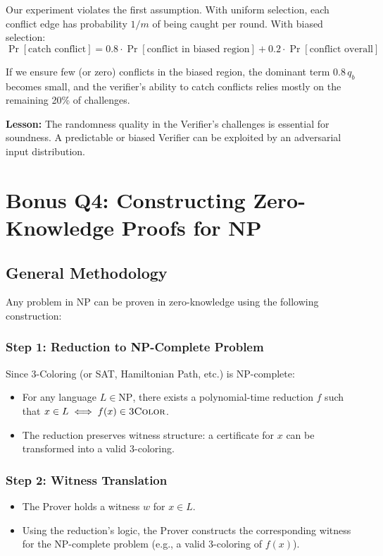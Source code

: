 \documentclass[11pt]{article}
\begin{document}
Our experiment violates the first assumption. With uniform selection, each conflict edge has probability $1/m$ of being caught per round. With biased selection:
\[
\Pr[\text{catch conflict}] = 0.8 \cdot \Pr[\text{conflict in biased region}] + 0.2 \cdot \Pr[\text{conflict overall}]
\]

If we ensure few (or zero) conflicts in the biased region, the dominant term $0.8\,q_b$ becomes small, and the verifier's ability to catch conflicts relies mostly on the remaining 20\% of challenges.

\textbf{Lesson:} The randomness quality in the Verifier's challenges is essential for soundness. A predictable or biased Verifier can be exploited by an adversarial input distribution.

\section{Bonus Q4: Constructing Zero-Knowledge Proofs for NP}

\subsection{General Methodology}

Any problem in NP can be proven in zero-knowledge using the following construction:

\subsubsection{Step 1: Reduction to NP-Complete Problem}
Since 3-Coloring (or SAT, Hamiltonian Path, etc.) is NP-complete:
\begin{itemize}
    \item For any language $L \in \text{NP}$, there exists a polynomial-time reduction $f$ such that $x \in L \iff f(x) \in \textsc{3Color}$.
    \item The reduction preserves witness structure: a certificate for $x$ can be transformed into a valid 3-coloring.
\end{itemize}

\subsubsection{Step 2: Witness Translation}
\begin{itemize}
    \item The Prover holds a witness $w$ for $x \in L$.
    \item Using the reduction's logic, the Prover constructs the corresponding witness for the NP-complete problem (e.g., a valid 3-coloring of $f(x)$).
\end{itemize}
\end{document}
